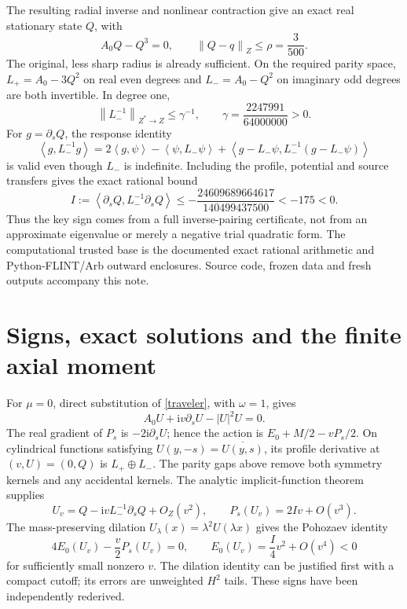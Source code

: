 \documentclass[11pt,a4paper]{article}
\newcommand{\ii}{\mathrm i}
\newcommand{\norm}[1]{\left\|#1\right\|}
\newcommand{\ip}[2]{\left\langle#1,#2\right\rangle}
\begin{document}
The resulting radial inverse and nonlinear contraction give an exact real stationary state $Q$, with
\[
 A_0Q-Q^3=0,\qquad \norm{Q-q}_Z\le\rho=\frac3{500}.
\]
The original, less sharp radius is already sufficient. On the required parity space, $L_+=A_0-3Q^2$ on real even degrees and $L_-=A_0-Q^2$ on imaginary odd degrees are both invertible. In degree one,
\[
 \norm{L_-^{-1}}_{Z^*\to Z}\le\gamma^{-1},\qquad
 \gamma=\frac{2247991}{64000000}>0.
\]
For $g=\partial_sQ$, the response identity
\[
 \ip g{L_-^{-1}g}=2\ip g\psi-\ip\psi{L_-\psi}
 +\ip{g-L_-\psi}{L_-^{-1}(g-L_-\psi)}
\]
is valid even though $L_-$ is indefinite. Including the profile, potential and source transfers gives the exact rational bound
\begin{equation}\label{Inegative}
 I:=\ip{\partial_sQ}{L_-^{-1}\partial_sQ}
 \le-\frac{24609689664617}{140499437500}<-175<0.
\end{equation}
Thus the key sign comes from a full inverse-pairing certificate, not from an approximate eigenvalue or merely a negative trial quadratic form. The computational trusted base is the documented exact rational arithmetic and Python-FLINT/Arb outward enclosures. Source code, frozen data and fresh outputs accompany this note.

\section{Signs, exact solutions and the finite axial moment}
For $\mu=0$, direct substitution of \eqref{traveler}, with $\omega=1$, gives
\begin{equation}\label{profile}
 A_0U+\ii v\partial_sU-|U|^2U=0.
\end{equation}
The real gradient of $P_s$ is $-2\ii\partial_sU$; hence the action is $E_0+M/2-vP_s/2$. On cylindrical functions satisfying $U(y,-s)=\overline{U(y,s)}$, its profile derivative at $(v,U)=(0,Q)$ is $L_+\oplus L_-$. The parity gaps above remove both symmetry kernels and any accidental kernels. The analytic implicit-function theorem supplies
\[
 U_v=Q-\ii v L_-^{-1}\partial_sQ+O_Z(v^2),\qquad
 P_s(U_v)=2Iv+O(v^3).
\]
The mass-preserving dilation $U_\lambda(x)=\lambda^2U(\lambda x)$ gives the Pohozaev identity
\begin{equation}\label{energy}
 4E_0(U_v)-\frac v2P_s(U_v)=0,
 \qquad E_0(U_v)=\frac I4v^2+O(v^4)<0
\end{equation}
for sufficiently small nonzero $v$. The dilation identity can be justified first with a compact cutoff; its errors are unweighted $H^2$ tails. These signs have been independently rederived.
\end{document}
